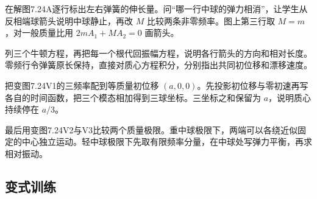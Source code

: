\documentclass[UTF8,fontset=fandol,a4paper,11pt]{ctexart}
\begin{document}
在解图7.24A逐行标出左右弹簧的伸长量。问“哪一行中球的弹力相消”，让学生从反相端球箭头说明中球静止，再改 $M$ 比较两条非零频率。图上第三行取 $M=m$，对一般质量比用 $2mA_1+MA_2=0$ 画箭头。

列三个牛顿方程，再把每一个根代回振幅方程，说明各行箭头的方向和相对长度。零频行令弹簧原长保持，直接对质心方程积分，分别指出共同初位移和漂移速度。

把变图7.24V1的三频率配到等质量初位移 $(a,0,0)$。先投影初位移与零初速再写各自的时间函数，把三个模态相加得到三球坐标。三坐标之和保留为 $a$，说明质心持续停在 $a/3$。

最后用变图7.24V2与V3比较两个质量极限。重中球极限下，两端可以各绕近似固定的中心独立运动。轻中球极限下先取有限频率分量，在中球处写弹力平衡，再求相对振动。




\subsection*{变式训练}
\end{document}
